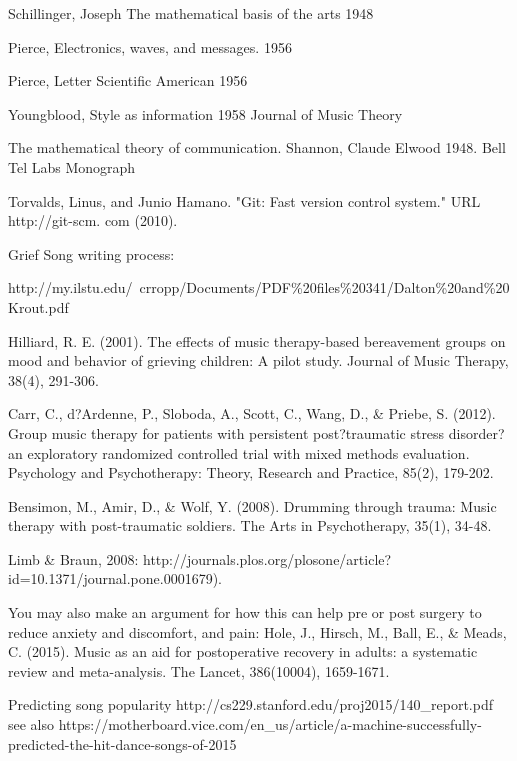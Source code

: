 \documentclass[final,authoryear,5p,times,twocolumn]{elsarticle}
\begin{document}
Schillinger, Joseph The mathematical basis of the arts 1948

Pierce, Electronics, waves, and messages. 1956

Pierce, Letter Scientific American 1956

Youngblood, Style as information 1958 Journal of Music Theory

The mathematical theory of communication. Shannon, Claude Elwood 1948. Bell Tel Labs Monograph

Torvalds, Linus, and Junio Hamano. "Git: Fast version control system." URL http://git-scm. com (2010).

Grief Song writing process:

http://my.ilstu.edu/~crropp/Documents/PDF\%20files\%20341/Dalton\%20and\%20Krout.pdf


Hilliard, R. E. (2001). The effects of music therapy-based bereavement groups on mood and behavior of grieving children: A pilot study. Journal of Music Therapy, 38(4), 291-306.

Carr, C., d?Ardenne, P., Sloboda, A., Scott, C., Wang, D., \& Priebe, S. (2012). Group music therapy for patients with persistent post?traumatic stress disorder?an exploratory randomized controlled trial with mixed methods evaluation. Psychology and Psychotherapy: Theory, Research and Practice, 85(2), 179-202.

Bensimon, M., Amir, D., \& Wolf, Y. (2008). Drumming through trauma: Music therapy with post-traumatic soldiers. The Arts in Psychotherapy, 35(1), 34-48.

Limb \& Braun, 2008: http://journals.plos.org/plosone/article?id=10.1371/journal.pone.0001679).

You may also make an argument for how this can help pre or post surgery to reduce anxiety and discomfort, and pain:
Hole, J., Hirsch, M., Ball, E., \& Meads, C. (2015). Music as an aid for postoperative recovery in adults: a systematic review and meta-analysis. The Lancet, 386(10004), 1659-1671.

Predicting song popularity http://cs229.stanford.edu/proj2015/140\_report.pdf see also https://motherboard.vice.com/en\_us/article/a-machine-successfully-predicted-the-hit-dance-songs-of-2015






\end{document}
